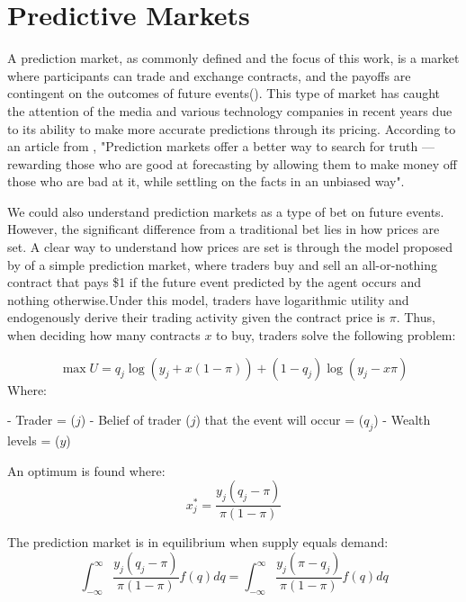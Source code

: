 \section{Predictive Markets}
\label{sec:predictive_markets}

A prediction market, as commonly defined and the focus of this work, is a market where participants can trade and exchange contracts, and the payoffs are contingent on the outcomes of future events(\citeauthor{wolfers2004prediction}). This type of market has caught the attention of the media and various technology companies in recent years due to its ability to make more accurate predictions through its pricing. According to an article from \textcite{roose2022wager}, "Prediction markets offer a better way to search for truth — rewarding those who are good at forecasting by allowing them to make money off those who are bad at it, while settling on the facts in an unbiased way".

We could also understand prediction markets as a type of bet on future events. However, the significant difference from a traditional bet lies in how prices are set. A clear way to understand how prices are set is through the model proposed by  \textcite{wolfers2004prediction}  of a simple prediction market, where traders buy and sell an all-or-nothing contract that pays  \$1 if the future event predicted by the agent occurs and nothing otherwise.Under this model, traders have logarithmic utility and endogenously derive their trading activity given the contract price is \( \pi \). Thus, when deciding how many contracts \( x \) to buy, traders solve the following problem:

\begin{equation}
    \max U = q_j \log(y_j + x(1 - \pi)) + (1 - q_j) \log(y_j - x\pi)
\end{equation}
Where:

- Trader = (\( j \))
- Belief of trader (\( j \)) that the event will occur = (\( q_j \))
- Wealth levels = (\( y \))

An optimum is found where:
\begin{equation}
    x_j^* = \frac{y_j(q_j - \pi)}{\pi(1 - \pi)}
\end{equation}

The prediction market is in equilibrium when supply equals demand:
\begin{equation}
    \int_{-\infty}^{\infty}\frac{y_j(q_j - \pi)}{\pi(1 - \pi)}f(q)dq = \int_{-\infty}^{\infty}\frac{y_j(\pi -q_j)}{\pi(1 - \pi)}f(q)dq
\end{equation}

